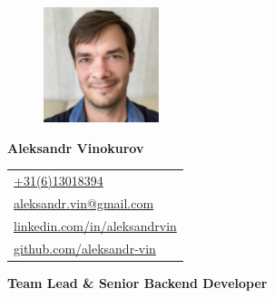 \documentclass[letterpaper, 11pt]{article}
\begin{document}
\begin{figure} %
  \vspace{-5ex} %
  \includegraphics[width=0.3\textwidth]{me.jpg} %
\end{figure}

\noindent\textbf{\Huge Aleksandr Vinokurov} 

\vspace{1em}

\noindent
\begin{tabular}{@{\hspace{5mm}}l}
\href{tel:+31613018394}{\url{+31(6)13018394}} \\
\href{mailto:aleksandr.vin@gmail.com}{\url{aleksandr.vin@gmail.com}} \\
\href{https://linkedin.com/in/aleksandrvin}{\url{linkedin.com/in/aleksandrvin}} \\
\href{https://github.com/aleksandr-vin}{\url{github.com/aleksandr-vin}}
\end{tabular}

\vspace{1em}

\noindent\parbox{\linewidth}{\raggedright\textbf{\Large Team Lead \& Senior Backend Developer}} %

\vspace{1em}








\end{document}
